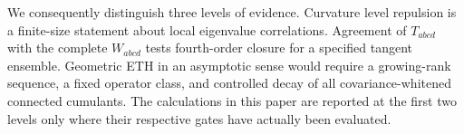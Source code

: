 We consequently distinguish three levels of evidence.  Curvature
level repulsion is a finite-size statement about local eigenvalue
correlations.  Agreement of $T_{abcd}$ with the complete $W_{abcd}$ tests
fourth-order closure for a specified tangent ensemble.  Geometric ETH in an
asymptotic sense would require a growing-rank sequence, a fixed
operator class, and controlled decay of all covariance-whitened connected
cumulants.  The calculations in this paper are reported at the first two
levels only where their respective gates have actually been evaluated.
